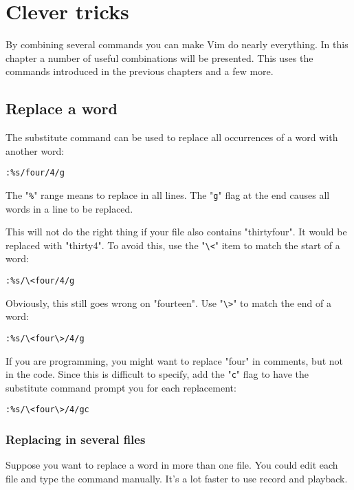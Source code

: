 \section{Clever tricks}
By combining several commands you can make Vim do nearly everything.  In this
chapter a number of useful combinations will be presented.  This uses the
commands introduced in the previous chapters and a few more.
\subsection{Replace a word}
The substitute command can be used to replace all occurrences of a word with another word:

\begin{Verbatim}[samepage=true]
 :%s/four/4/g
\end{Verbatim}

The "\verb!%!" range means to replace in all lines.
The "\verb!g!" flag at the end causes all words in a line to be replaced.

This will not do the right thing if your file also contains "thirtyfour".
It would be replaced with "thirty4".
To avoid this, use the "\verb!\<!" item to match the start of a word:

\begin{Verbatim}[samepage=true]
 :%s/\<four/4/g
\end{Verbatim}

Obviously, this still goes wrong on "fourteen".  Use "\verb!\>!" to match the end of
a word:

\begin{Verbatim}[samepage=true]
 :%s/\<four\>/4/g
\end{Verbatim}

If you are programming, you might want to replace "four" in comments, but not in the code.
Since this is difficult to specify, add the "\verb!c!" flag to have the substitute command prompt you for each replacement:

\begin{Verbatim}[samepage=true]
 :%s/\<four\>/4/gc
\end{Verbatim}

\subsubsection{Replacing in several files}
Suppose you want to replace a word in more than one file.
You could edit each file and type the command manually.
It's a lot faster to use record and playback.

